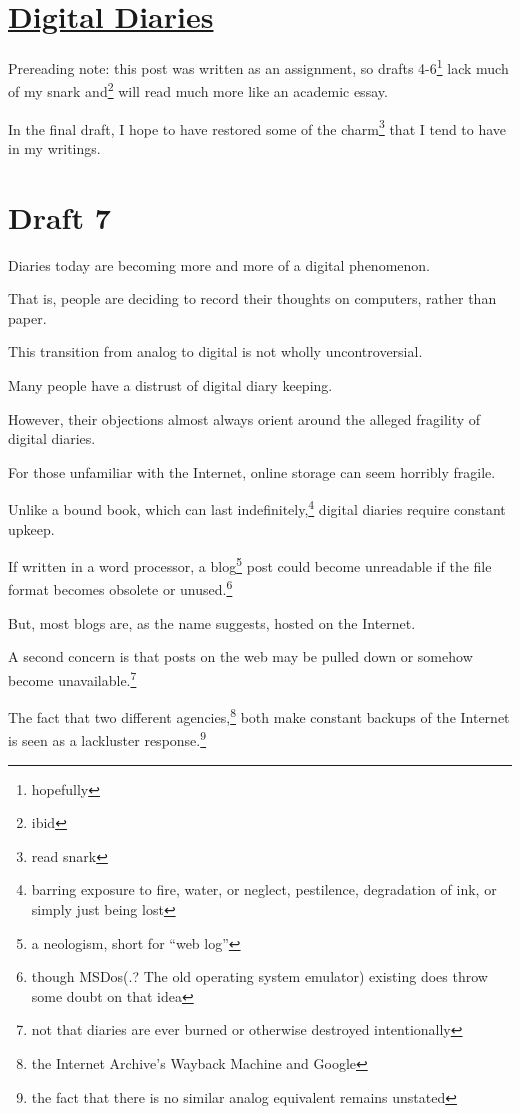 \documentclass[12pt]{article}[titlepage]
\newcommand{\say}[1]{``#1''}
\newcommand{\1}{\={a}}
\newcommand{\2}{\={e}}
\newcommand{\3}{\={\i}}
\newcommand{\4}{\=o}
\newcommand{\5}{\=u}
\newcommand{\6}{\={A}}
\renewcommand{\,}{\textsuperscript{,}}
\begin{document}
\doublespacing

\section{\href{digital-diaries.html}{Digital Diaries}}

Prereading note: this post was written as an assignment, so drafts 4-6\footnote{hopefully} lack much of my snark and\footnote{ibid} will read much more like an academic essay.

In the final draft, I hope to have restored some of the charm\footnote{read snark} that I tend to have in my writings.


\section{Draft 7}

Diaries today are becoming more and more of a digital phenomenon.

That is, people are deciding to record their thoughts on computers, rather than paper.

This transition from analog to digital is not wholly uncontroversial.


Many people have a distrust of digital diary keeping.

However, their objections almost always orient around the alleged fragility of digital diaries.


For those unfamiliar with the Internet, online storage can seem horribly fragile.

Unlike a bound book, which can last indefinitely,\footnote{barring exposure to fire, water, or neglect, pestilence, degradation of ink, or simply just being lost} digital diaries require constant upkeep.

If written in a word processor, a blog\footnote{a neologism, short for \say{web log}} post could become unreadable if the file format becomes obsolete or unused.\footnote{though MSDos(.? The old operating system emulator) existing does throw some doubt on that idea}

But, most blogs are, as the name suggests, hosted on the Internet.


A second concern is that posts on the web may be pulled down or somehow become unavailable.\footnote{not that diaries are ever burned or otherwise destroyed intentionally}

The fact that two different agencies,\footnote{the Internet Archive’s Wayback Machine and Google} both make constant backups of the Internet is seen as a lackluster response.\footnote{the fact that there is no similar analog equivalent remains unstated}
\end{document}
